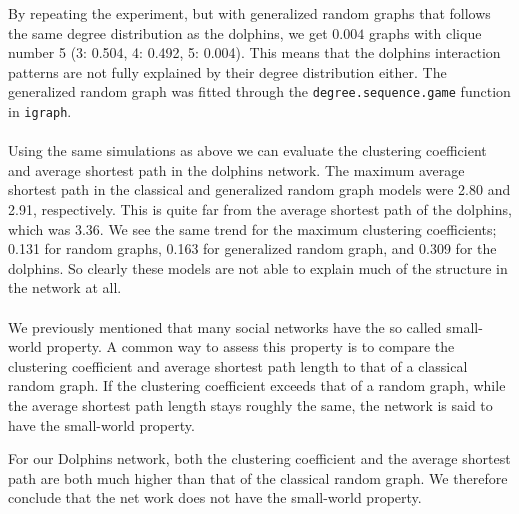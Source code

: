 \documentclass[11pt,a4paper]{article}
\begin{document}
By repeating the experiment, but with generalized random graphs that follows the same degree distribution as the dolphins, we get $0.004$ graphs with clique number 5 (3: 0.504, 4:  0.492, 5: 0.004). This means that the dolphins interaction patterns are not fully explained by their degree distribution either.
The generalized random graph was fitted through the \verb+degree.sequence.game+ function in \verb+igraph+.
\\
\\
Using the same simulations as above we can evaluate the clustering coefficient and average shortest path in the dolphins network. The maximum average shortest path in the classical and generalized random graph models were  2.80 and 2.91, respectively. This is quite far from the average shortest path of the dolphins, which was 3.36.  We see the same trend for the maximum clustering coefficients; 0.131 for random graphs, 0.163 for generalized random graph, and 0.309 for the dolphins.
So clearly these models are not able to explain much of the structure in the network at all. 
\\
\\
We previously mentioned that many social networks have the so called small-world property. A common way to assess this property is to compare the clustering coefficient and average shortest path length to that of a classical random graph. If the clustering coefficient exceeds that of a random graph, while the average shortest path length stays roughly the same, the network is said to have the small-world property.

For our Dolphins network, both the clustering coefficient and the average shortest path are both much higher than that of the classical random graph. We therefore conclude that the net work does not have the small-world property.
\end{document}
